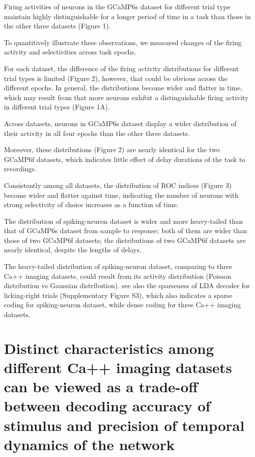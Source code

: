 \documentclass[12pt, oneside]{nature}
\begin{document}
\noindent Firing activities of neurons in the GCaMP6s dataset for 
different trial type maintain highly distinguishable for a longer 
period of time in a task than those in the other three datasets (Figure 1).

\noindent To quantitively illustrate these observations, we measured changes
of the firing activity and selectivities across task epochs. 

\noindent For each dataset, the difference of the firing activity distributions 
for different trial types is limited (Figure 2), however, that could be obvious 
across the different epochs. In general, the distributions become wider and 
flatter in time, which may result from that more neurons exhibit a distinguishable 
firing activity in different trial types (Figure 1A). 

\noindent Across datasets, neurons in GCaMP6s dataset display a wider 
distribution of their activity in all four epochs than the other three datasets. 

\noindent Moreover, these distributions (Figure 2) are nearly identical for the 
two GCaMP6f datasets, which indicates little effect of delay durations of the task 
to recordings.

\noindent Consistently among all datasets, the distribution of ROC indices (Figure 3)
become wider and flatter against time, indicating the number of neurons 
with strong selectivity of choice increases as a function of time.

\noindent The distribution of spiking-neuron dataset is wider and more heavy-tailed 
than that of GCaMP6s dataset from sample to response; both of them are wider than 
those of two GCaMP6f datasets; the distributions of two GCaMP6f datasets are nearly 
identical, despite the lengths of delays.

\noindent The heavy-tailed distribution of spiking-neuron dataset,
comparing to three Ca++ imaging datasets, could result from
its activity distribution (Poisson distribution vs Gaussian distribution).
see also the sparseness of LDA decoder for licking-right
trials (Supplementary Figure S3), which also indicates a
sparse coding for spiking-neuron dataset, while
dense coding for three Ca++ imaging datasets.

\section*{Distinct characteristics among different Ca++ imaging datasets
can be viewed as a trade-off between decoding accuracy of stimulus
and precision of temporal dynamics of the network}
\end{document}

